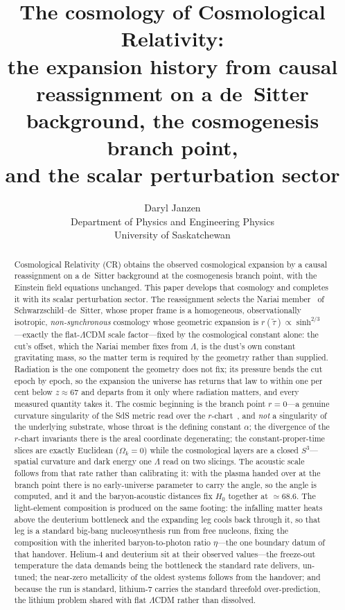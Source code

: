 \documentclass[11pt,a4paper]{article}
\title{The cosmology of Cosmological Relativity:\\
\large the expansion history from causal reassignment on a de~Sitter background, the cosmogenesis branch point,\\
and the scalar perturbation sector}
\author{Daryl Janzen\\
\small Department of Physics and Engineering Physics\\
\small University of Saskatchewan}
\date{}
\theoremstyle{plain}
\theoremstyle{definition}
\theoremstyle{remark}
\begin{document}
\maketitle

\begin{abstract}
Cosmological Relativity (CR) obtains the observed cosmological expansion by a causal reassignment on a de~Sitter background at the cosmogenesis branch point, with the Einstein field equations unchanged. This paper develops that cosmology and completes it with its scalar perturbation sector. The reassignment selects the Nariai member~\cite{Nariai1951} of Schwarzschild--de~Sitter, whose proper frame is a homogeneous, observationally isotropic, \emph{non-synchronous} cosmology whose geometric expansion is $r(\tilde\tau)\propto\sinh^{2/3}$---exactly the flat-$\Lambda$CDM scale factor---fixed by the cosmological constant alone: the cut's offset, which the Nariai member fixes from $\Lambda$, is the dust's own constant gravitating mass, so the matter term is required by the geometry rather than supplied. Radiation is the one component the geometry does not fix; its pressure bends the cut epoch by epoch, so the expansion the universe has returns that law to within one per cent below $z\approx67$ and departs from it only where radiation matters, and every measured quantity takes it. The cosmic beginning is the branch point $r=0$---a genuine curvature singularity of the SdS metric read over the $r$-chart~\cite{JanzenCircle}, and \emph{not} a singularity of the underlying substrate, whose throat is the defining constant $\alpha$; the divergence of the $r$-chart invariants there is the areal coordinate degenerating; the constant-proper-time slices are exactly Euclidean ($\Omega_k=0$) while the cosmological layers are a closed $S^3$---spatial curvature and dark energy one $\Lambda$ read on two slicings. The acoustic scale follows from that rate rather than calibrating it: with the plasma handed over at the branch point there is no early-universe parameter to carry the angle, so the angle is computed, and it and the baryon-acoustic distances fix $H_0$ together at ${\simeq}68.6$. The light-element composition is produced on the same footing: the infalling matter heats above the deuterium bottleneck and the expanding leg cools back through it, so that leg is a standard big-bang nucleosynthesis run from free nucleons, fixing the composition with the inherited baryon-to-photon ratio $\eta$---the one boundary datum of that handover. Helium-4 and deuterium sit at their observed values---the freeze-out temperature the data demands being the bottleneck the standard rate delivers, un-tuned; the near-zero metallicity of the oldest systems follows from the handover; and because the run is standard, lithium-7 carries the standard threefold over-prediction, the lithium problem shared with flat $\Lambda$CDM rather than dissolved.


\end{abstract}
\end{document}
